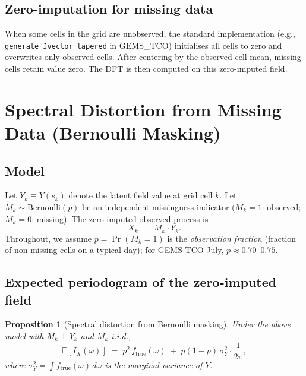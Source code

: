 \documentclass[12pt]{article}
\newtheorem{proposition}{Proposition}
\begin{document}
\subsection{Zero-imputation for missing data}

When some cells in the grid are unobserved, the standard implementation
(e.g., \texttt{generate\_Jvector\_tapered} in GEMS\_TCO) initialises
all cells to zero and overwrites only observed cells.
After centering by the observed-cell mean, missing cells retain value
zero.  The DFT is then computed on this zero-imputed field.


\section{Spectral Distortion from Missing Data (Bernoulli Masking)}

\subsection{Model}

Let $Y_k \equiv Y(s_k)$ denote the latent field value at grid cell $k$.
Let $M_k \sim \text{Bernoulli}(p)$ be an independent missingness
indicator ($M_k = 1$: observed; $M_k = 0$: missing).
The zero-imputed observed process is
\[
    X_k \;=\; M_k \cdot Y_k.
\]
Throughout, we assume $p = \Pr(M_k=1)$ is the \emph{observation
fraction} (fraction of non-missing cells on a typical day); for GEMS TCO
July, $p \approx 0.70$--$0.75$.

\subsection{Expected periodogram of the zero-imputed field}

\begin{proposition}[Spectral distortion from Bernoulli masking]
\label{prop:bernoulli}
Under the above model with $M_k \perp Y_k$ and $M_k$ i.i.d.,
\[
    \mathbb{E}[I_X(\omega)]
    \;=\; p^2 \, f_{\mathrm{true}}(\omega)
        \;+\; p(1-p)\,\sigma^2_Y \cdot \frac{1}{2\pi},
\]
where $\sigma^2_Y = \int f_{\mathrm{true}}(\omega)\,d\omega$
is the marginal variance of $Y$.
\end{proposition}
\end{document}
